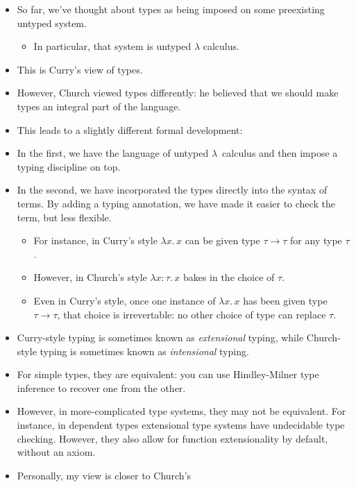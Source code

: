 \documentclass{lecturenotes}
\newcommand{\abs}[2]{\ensuremath{\lambda #1.\,#2}}
\newcommand{\tabs}[3]{\ensuremath{\lambda #1 \colon #2.\,#3}}
\newcommand{\app}[2]{\ensuremath{#1\;#2}}
\begin{document}
\begin{itemize}
\item So far, we've thought about types as being imposed on some preexisting untyped system.
  \begin{itemize}
  \item In particular, that system is untyped $\lambda$ calculus.
  \end{itemize}
\item This is Curry's view of types.
\item However, Church viewed types differently: he believed that we should make types an integral part of the language.
\item This leads to a slightly different formal development:
\end{itemize}
\begin{syntax}
    \alternative{\tabs{x}{\tau}{e}} \alternative{\app{t}{u}}
\end{syntax}
\begin{itemize}
\item In the first, we have the language of untyped $\lambda$~calculus and then impose a typing discipline on top.
\item In the second, we have incorporated the types directly into the syntax of terms.
  By adding a typing annotation, we have made it easier to check the term, but less flexible.
  \begin{itemize}
  \item For instance, in Curry's style $\abs{x}{x}$ can be given type $\tau \to \tau$ for any type $\tau$.
  \item However, in Church's style $\tabs{x}{\tau}{x}$ bakes in the choice of $\tau$.
  \item Even in Curry's style, once one instance of $\abs{x}{x}$ has been given type $\tau \to \tau$, that choice is irrevertable: no other choice of type can replace $\tau$.
  \end{itemize}
\item Curry-style typing is sometimes known as \emph{extensional} typing, while Church-style typing is sometimes known as \emph{intensional} typing.
\item For simple types, they are equivalent: you can use Hindley-Milner type inference to recover one from the other.
\item However, in more-complicated type systems, they may not be equivalent.
  For instance, in dependent types extensional type systems have undecidable type checking.
  However, they also allow for function extensionality by default, without an axiom.
\item Personally, my view is closer to Church's
\end{itemize}
\end{document}
